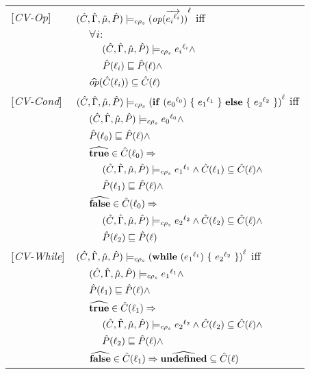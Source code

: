 \begin{tabular}{l l l l}
{[\textit{CV-Op}]}&\multicolumn{3}{l}{$ \ccestl {\op (\vec{\lbt i})} $ iff}\\
&&\multicolumn{2}{l}{$\forall i :$}\\
&&&$\ccest {\lbt i} \wedge $\\
&&&$\Pat(\ell_i) \sqsubseteq \Pat(\ell) \wedge$\\
&&\multicolumn{2}{l}{$\widehat{op} (\Cat(\ell_i)) \subseteq \Cat(\ell) $}\\
{[\textit{CV-Cond}]}&\multicolumn{3}{l}{$\ccestl{\cond {\lbt 0} {\lbt 1} {\lbt 2}} $ iff}\\
&&\multicolumn{2}{l}{$ \ccest {\lbt 0} \wedge $}\\
&&\multicolumn{2}{l}{$\Pat(\ell_0) \sqsubseteq \Pat(\ell) \wedge$} \\
&&\multicolumn{2}{l}{$\widehat{\true} \in \Cat(\ell_0) \Rightarrow$}\\
&&&$\ccest {\lbt 1} \wedge \Cat(\ell_1) \subseteq \Cat(\ell)\wedge$\\
&&&$\Pat(\ell_1) \sqsubseteq \Pat(\ell) \wedge$ \\
&&\multicolumn{2}{l}{$\widehat{\false} \in \Cat(\ell_0) \Rightarrow$}\\
&&&$\ccest {\lbt 2} \wedge \Cat(\ell_2) \subseteq \Cat(\ell) \wedge$\\
&&&$\Pat(\ell_2) \sqsubseteq \Pat(\ell)$ \\
{[\textit{CV-While}]}&\multicolumn{3}{l}{$\ccestl {\while {\lbt 1} {\lbt 2}} $ iff}\\
&&\multicolumn{2}{l}{$ \ccest {\lbt 1} \wedge $}\\
&&\multicolumn{2}{l}{$\Pat(\ell_1) \sqsubseteq \Pat(\ell) \wedge$} \\
&&\multicolumn{2}{l}{$\widehat{\true} \in \Cat(\ell_1) \Rightarrow$}\\
&&&$\ccest {\lbt 2} \wedge \Cat(\ell_2) \subseteq \Cat(\ell) \wedge$\\
&&&$ \Pat(\ell_2) \sqsubseteq \Pat(\ell) \wedge$\\
&&\multicolumn{2}{l}{$\widehat{\false} \in \Cat(\ell_1) \Rightarrow \widehat{\undef} \subseteq \Cat(\ell)$}\\
\end{tabular}

